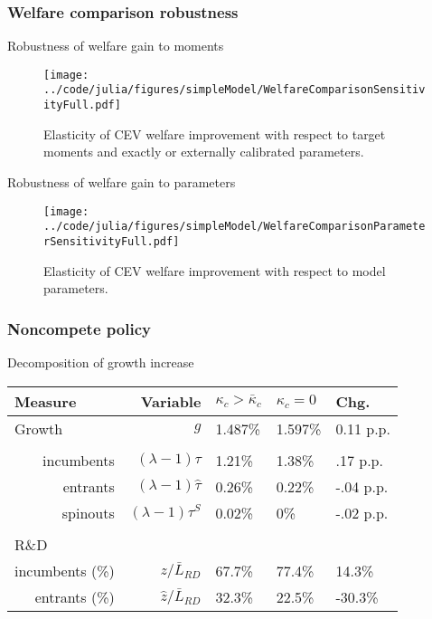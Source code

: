 \documentclass[english,usenames,dvipsnames]{beamer}
\begin{document}
\subsubsection{Welfare comparison robustness}

\begin{frame}{Robustness of welfare gain to moments}\label{robustness_to_moments}
\hyperlink{reducing_kappa_c_table}{}
	\begin{figure}
		\texttt{[image: ../code/julia/figures/simpleModel/WelfareComparisonSensitivityFull.pdf]}
		\caption{Elasticity of CEV welfare improvement with respect to target moments and exactly or externally calibrated parameters.}
		\label{WelfareComparisonSensitivityFull}
	\end{figure}
\end{frame}

\begin{frame}{Robustness of welfare gain to parameters}\label{robustness_to_parameters}
	\hyperlink{reducing_kappa_c_table}{}
	\begin{figure}
		\texttt{[image: ../code/julia/figures/simpleModel/WelfareComparisonParameterSensitivityFull.pdf]}
		\caption{Elasticity of CEV welfare improvement with respect to model parameters.}
		\label{WelfareComparisonSensitivityFull}
	\end{figure}
\end{frame}


\subsubsection{Noncompete policy}

\begin{frame}{Decomposition of growth increase}\label{decomposition_growth_increase}
	\hyperlink{reducing_kappa_c_table}{}
	\begin{table}
		\centering
		\footnotesize
		\begin{tabular}{lrlll}
			\toprule \toprule
			Measure & Variable & $\kappa_c > \bar{\kappa}_c$ & $\kappa_c = 0$ & Chg. \tabularnewline
			\midrule
			Growth & $g$ & 1.487\% & 1.597\% & 0.11 p.p.\tabularnewline
		\tabularnewline
			\multicolumn{1}{r}{incumbents} & $(\lambda -1) \tau$  & 1.21\% & 1.38\% & .17 p.p. \tabularnewline
			\multicolumn{1}{r}{entrants} & $(\lambda -1) \hat{\tau}$ & 0.26\% & 0.22\% & -.04 p.p. \tabularnewline
			\multicolumn{1}{r}{spinouts} & $(\lambda -1) \tau^S$ & 0.02\% & 0\% & -.02 p.p. \tabularnewline
			\tabularnewline
			R\&D & & & & 
			\tabularnewline
			\multicolumn{1}{r}{incumbents (\%)}  & $z / \bar{L}_{RD}$ & 67.7\% & 77.4\% & 14.3\% \tabularnewline 
			
			\multicolumn{1}{r}{entrants (\%)}  & $\hat{z} / \bar{L}_{RD}$ & 32.3\% & 22.5\% & -30.3\% \tabularnewline
			\bottomrule
		\end{tabular}
	\end{table}
\end{frame}
\end{document}
